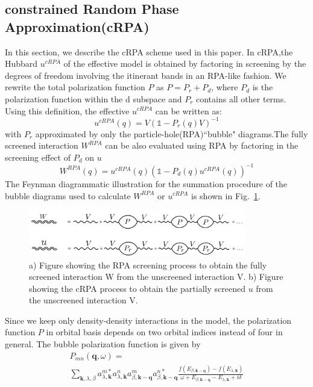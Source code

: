 \documentclass[10pt]{ruthesis}
\begin{document}
{\subsection{constrained Random Phase Approximation(cRPA)}
In this section, we describe the cRPA scheme used in this paper. In cRPA\cite{PRB_lowenegymodel_for_firstprincilpes__2004_F.Ary},the Hubbard $u^{cRPA}$ of the effective model is obtained by factoring in screening by the degrees of freedom involving the itinerant bands in an RPA-like fashion. We rewrite the total polarization function $P$ as $P=P_r+P_d$, where $P_d$ is the polarization function within the d subspace and $P_r$  contains all other terms. Using this definition, the effective $u^{cRPA}$ can be written as:
\begin{equation}
u^{cRPA}(q)=V(\mathbb{1}-P_r(q)V)^{-1} \label{cRPA Eq}
\end{equation}
with $P_r$ approximated by only the particle-hole(RPA)``bubble" diagrams.The fully screened interaction $W^{RPA}$ can be also evaluated using RPA by factoring in the screening effect of $P_d$ on $u$
\begin{equation}\label{W_def}
W^{RPA}(q)=u^{cRPA}(q)(\mathbb{1}-P_d(q)u^{cRPA}(q))^{-1}
\end{equation} 
The Feynman diagrammatic  illustration for the summation procedure of the bubble diagrams used to calculate $W^{RPA}$ or $u^{cRPA}$ is shown in Fig.~\ref{fig2}.
\begin{figure}[h]
 \includegraphics[width=\columnwidth, height=0.8in]{./plotForpublishing/RPA.png}
 \caption{\label{fig2} a) Figure showing the RPA screening process to obtain the fully screened interaction W from the unscreened interaction V. b) Figure showing the cRPA process to obtain the partially screened $u$ from the unscreened interaction V.  }
\end{figure}
Since we keep only density-density interactions in the model, the polarization function $P$ in orbital basis depends on two orbital indices instead of four in general. The bubble polarization function is given by
\begin{multline}
P_{mn}(\mathbf q,\omega)=\\
\sum_{\mathbf k,\lambda,\beta}a^{m*}_{\lambda,\mathbf k}a^n_{\lambda,\mathbf k}a^{m}_{\beta,\mathbf{k-q}}a^{n*}_{\beta,\mathbf{k-q}}\frac{f(E_{\beta,\mathbf{k-q}})-f(E_{\lambda,\mathbf k})}{\omega+E_{\beta,\mathbf{k-q}}-E_{\lambda,\mathbf k}+i\delta}\label{polarzationeq}

\end{multline}}
\end{document}

